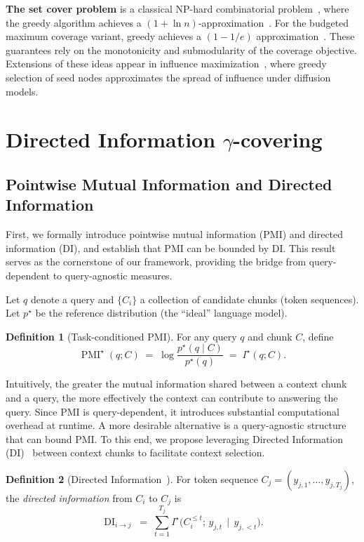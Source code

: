 \documentclass{article} %
\theoremstyle{definition}
\newtheorem{definition}{Definition}[section]
\DeclareMathOperator{\DI}{DI}
\begin{document}
\textbf{The set cover problem} is a classical NP-hard combinatorial problem~\citep{karp1972reducibility}, where the greedy algorithm achieves a $(1+\ln n)$-approximation~\citep{johnson1974approximation}. 
For the budgeted maximum coverage variant, greedy achieves a $(1-1/e)$ approximation~\citep{nemhauser1978analysis}. 
These guarantees rely on the monotonicity and submodularity of the coverage objective. 
Extensions of these ideas appear in influence maximization~\citep{kempe2003maximizing}, where greedy selection of seed nodes approximates the spread of influence under diffusion models. 

\section{Directed Information $\gamma$-covering}



\subsection{Pointwise Mutual Information and Directed Information}

First, we formally introduce pointwise mutual information (PMI) and directed information (DI), and establish that PMI can be bounded by DI. This result serves as the cornerstone of our framework, providing the bridge from query-dependent to query-agnostic measures.

Let $q$ denote a query and $\{C_i\}$ a collection of candidate chunks (token sequences).  
Let $p^\star$ be the reference distribution (the ``ideal'' language model).  

\begin{definition}
[Task-conditioned PMI] For any query $q$ and chunk $C$, define
\[
\operatorname{PMI}^\star(q;C) \;=\; \log\frac{p^\star(q\mid C)}{p^\star(q)} \;=\; I^\star(q;C).
\]
\end{definition}

Intuitively, the greater the mutual information shared between a context chunk and a query, the more effectively the context can contribute to answering the query. Since PMI is query-dependent, it introduces substantial computational overhead at runtime. A more desirable alternative is a query-agnostic structure that can bound PMI. To this end, we propose leveraging Directed Information (DI)~\citep{massey1990causality} between context chunks to facilitate context selection.

\begin{definition}[Directed Information~\citep{massey1990causality}]
For token sequence $C_j = (y_{j,1},\dots,y_{j,T_j})$, the \emph{directed information} from $C_i$ to $C_j$ is
\[
\DI_{i\to j} \;=\; \sum_{t=1}^{T_j} I^\star\!\big(C_i^{\leq t};\, y_{j,t}\,\mid\, y_{j,<t}\big).
\]
\end{definition}
\end{document}
